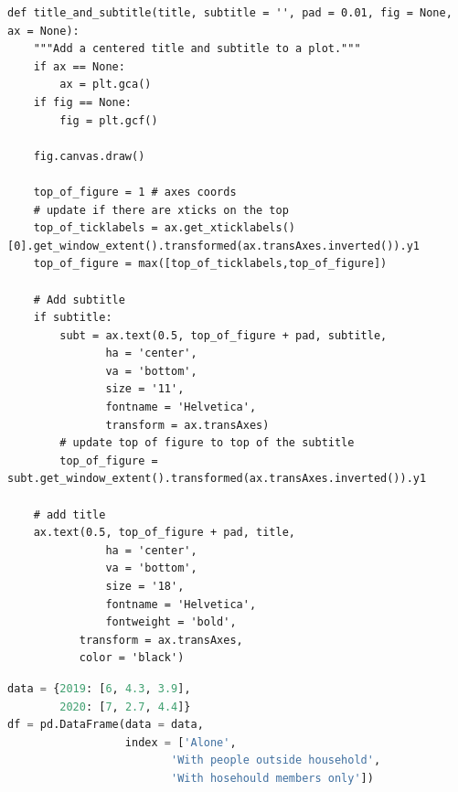 \begin{lstlisting}
def title_and_subtitle(title, subtitle = '', pad = 0.01, fig = None, ax = None):
    """Add a centered title and subtitle to a plot."""
    if ax == None:
        ax = plt.gca()
    if fig == None:
        fig = plt.gcf()
    
    fig.canvas.draw()
    
    top_of_figure = 1 # axes coords
    # update if there are xticks on the top 
    top_of_ticklabels = ax.get_xticklabels()[0].get_window_extent().transformed(ax.transAxes.inverted()).y1
    top_of_figure = max([top_of_ticklabels,top_of_figure])
        
    # Add subtitle
    if subtitle:
        subt = ax.text(0.5, top_of_figure + pad, subtitle, 
               ha = 'center',
               va = 'bottom',
               size = '11',
               fontname = 'Helvetica',
               transform = ax.transAxes)
        # update top of figure to top of the subtitle
        top_of_figure = subt.get_window_extent().transformed(ax.transAxes.inverted()).y1
        
    # add title
    ax.text(0.5, top_of_figure + pad, title, 
               ha = 'center',
               va = 'bottom',
               size = '18',
               fontname = 'Helvetica',
               fontweight = 'bold',
           transform = ax.transAxes,
           color = 'black')
\end{lstlisting}



\begin{lstlisting}[language = Python]
data = {2019: [6, 4.3, 3.9],
        2020: [7, 2.7, 4.4]}
df = pd.DataFrame(data = data,
                  index = ['Alone', 
                         'With people outside household', 
                         'With hosehould members only'])
\end{lstlisting}



